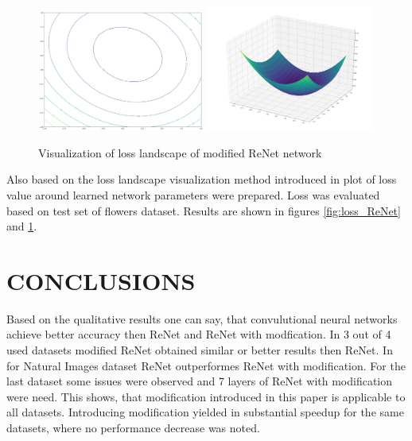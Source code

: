 \documentclass[a4paper, 10 pt, conference]{ieeeconf}
\begin{document}
\begin{figure}
\centering
	\includegraphics[width=0.49\textwidth]{img/loss_modif_ReNet.png}
	\includegraphics[width=0.49\textwidth]{img/loss_3d_modif_ReNet.png}
	\caption{Visualization of loss landscape of modified ReNet network}
	\label{fig:loss_modif_ReNet}
\end{figure}

Also based on the loss landscape visualization method introduced in \cite{DBLP:journals/corr/abs-1712-09913} plot of loss value around learned network parameters were prepared. Loss was evaluated based on test set of flowers dataset. Results are shown in figures \ref{fig:loss_ReNet} and \ref{fig:loss_modif_ReNet}.

\section{CONCLUSIONS}

Based on the qualitative results one can say, that convulutional neural networks achieve better accuracy then ReNet and ReNet with modfication. In 3 out of 4 used datasets modified ReNet obtained similar or better results then ReNet. In for Natural Images dataset ReNet outperformes ReNet with modification. For the last dataset some issues were observed and 7 layers of ReNet with modification were need. This shows, that modification introduced in this paper is applicable to all datasets. Introducing modification yielded in substantial speedup for the same datasets, where no performance decrease was noted.
\end{document}
